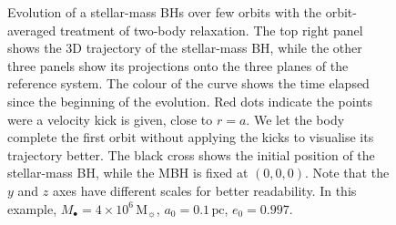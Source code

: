 \documentclass[desactivate]{aa}
\begin{document}
        \begin{figure}
            \centering
            \caption{Evolution of a stellar-mass BHs over few orbits with the orbit-averaged treatment of two-body relaxation. The top right panel shows the 3D trajectory of the stellar-mass BH, while the other three panels show its projections onto the three planes of the reference system. The colour of the curve shows the time elapsed since the beginning of the evolution. Red dots indicate the points were a velocity kick is given, close to $r=a$. We let the body complete the first orbit without applying the kicks to visualise its trajectory better. The black cross shows the initial position of the stellar-mass BH, while the MBH is fixed at $(0,0,0)$. Note that the $y$ and $z$ axes have different scales for better readability. In this example, $M_\bullet = 4 \times 10^6 \, \mathrm{M}_\sun$, $a_0 = 0.1 \, \mathrm{pc}$, $e_0=0.997$.}
            \label{fig:orbits_OA}
        \end{figure}
        
\end{document}
